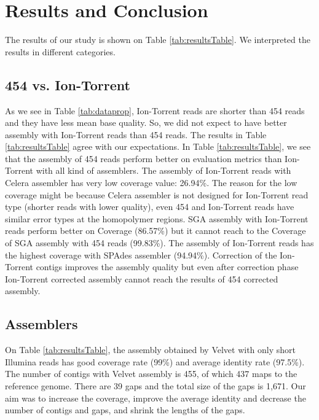 \documentclass{llncs}
\begin{document}
\section{Results and Conclusion}
The results of our study is shown on Table \ref{tab:resultsTable}. We interpreted the results in different categories. 

\subsection{454 vs. Ion-Torrent}
\label{454Ion}
As we see in Table \ref{tab:dataprop}, Ion-Torrent reads are shorter than 454 reads and they have less mean base quality. So, we did not expect to have better assembly with Ion-Torrent reads than 454 reads. The results in Table \ref{tab:resultsTable} agree with our expectations.
In Table \ref{tab:resultsTable}, we see that the assembly of 454 reads perform better on evaluation metrics than Ion-Torrent with all kind of assemblers. The assembly of Ion-Torrent reads with Celera assembler has very low coverage value: 26.94\%. The reason for the low coverage might be because Celera assembler is not designed for Ion-Torrent read type (shorter reads with lower quality), even 454 and Ion-Torrent reads have similar error types at the homopolymer regions. SGA assembly with Ion-Torrent reads perform better on Coverage (86.57\%) but it cannot reach to the Coverage of SGA assembly with 454 reads (99.83\%). The assembly of Ion-Torrent reads has the highest coverage with SPAdes assembler (94.94\%). Correction of the Ion-Torrent contigs improves the assembly quality but even after correction phase Ion-Torrent corrected assembly cannot reach the results of 454 corrected assembly. 

\subsection{Assemblers}

On Table \ref{tab:resultsTable}, the assembly obtained by Velvet with only short Illumina reads has good coverage rate (99\%) and average identity rate (97.5\%). The number of contigs with Velvet assembly is 455, of which 437 maps to the reference genome. There are 39 gaps and the total size of the gaps is 1,671. Our aim was to increase the coverage, improve the average identity and decrease the number of contigs and gaps, and shrink the lengths of the gaps.
\end{document}
